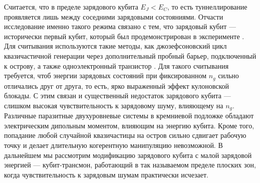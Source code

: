 Считается, что в пределе зарядового кубита $E_J < E_C$, то есть туннеллирование проявляется лишь между соседними зарядовыми состояниями. Отчасти исследование именно такого режима связано с тем, что зарядовый кубит --- исторически первый кубит, который был продемонстрирован в эксперименте \cite{nakamura1999coherent}. Для считывания используются такие методы, как джозефсоновский цикл квазичастичной генерации через дополнительный пробный барьер, подключенный к острову, а также одноэлектронный транзистор \cite{pashkin2009josephson}. Для такого считывания требуется, чтоб энергии зарядовых состояний при фиксированном $n_g$ сильно отличались друг от друга, то есть, ярко выраженный эффект кулоновской блокады. С этим связан и существенный недостаток зарядового кубита --- слишком высокая чувствительность к зарядовому шуму, влияющему на $n_g$. Различные паразитные двухуровневые системы в кремниевой подложке обладают электрическим дипольным моментом, влияющим на энергию кубита. Кроме того, попадание любой случайной квазичастицы на остров сильно сдвигает рабочую точку и делает длительную когерентную манипуляцию невозможной. В дальнейшем мы рассмотрим модификацию зарядового кубита с малой зарядовой энергией --- кубит-трансмон, работающий в так называемом пределе плоских зон, когда чувствительность к зарядовым шумам практически исчезает.
